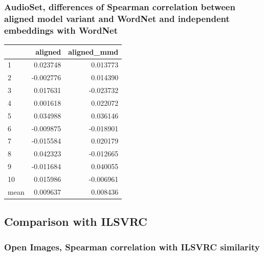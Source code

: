 \subsubsection{AudioSet, differences of Spearman correlation between aligned model variant and WordNet and independent embeddings with WordNet}

\begin{tabular}{lrr}
\toprule
{} &   aligned &  aligned\_mmd \\
\midrule
1    &  0.023748 &     0.013773 \\
2    & -0.002776 &     0.014390 \\
3    &  0.017631 &    -0.023732 \\
4    &  0.001618 &     0.022072 \\
5    &  0.034988 &     0.036146 \\
6    & -0.009875 &    -0.018901 \\
7    & -0.015584 &     0.020179 \\
8    &  0.042323 &    -0.012665 \\
9    & -0.011684 &     0.040055 \\
10   &  0.015986 &    -0.006961 \\
\midrule
mean &  0.009637 &     0.008436 \\
\bottomrule
\end{tabular}

\subsection{Comparison with ILSVRC}

\subsubsection{Open Images, Spearman correlation with ILSVRC similarity}


